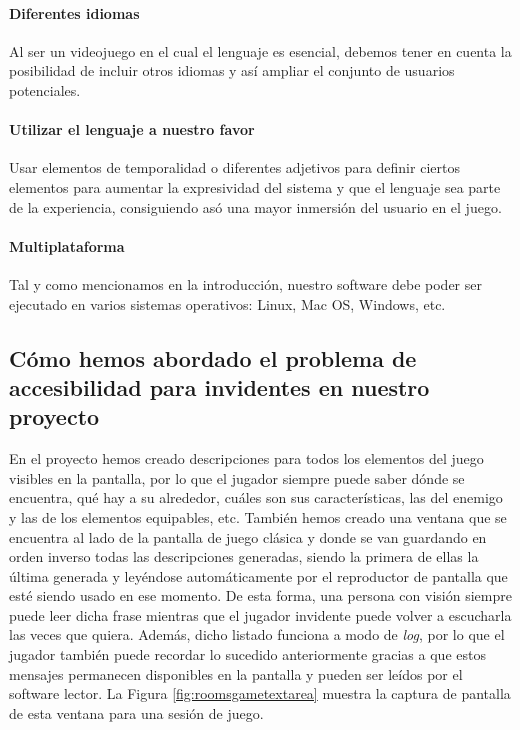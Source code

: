 	\paragraph{Diferentes idiomas} Al ser un videojuego en el cual el lenguaje es esencial, debemos tener en cuenta la posibilidad de incluir otros idiomas y así ampliar el conjunto de usuarios potenciales.
  \paragraph{Utilizar el lenguaje a nuestro favor} Usar elementos de temporalidad o diferentes adjetivos para definir ciertos elementos para aumentar la expresividad del sistema y que el lenguaje sea parte de la experiencia, consiguiendo asó una mayor inmersión del usuario en el juego.
	\paragraph{Multiplataforma} Tal y como mencionamos en la introducción, nuestro software debe poder ser ejecutado en varios sistemas operativos: Linux, Mac OS, Windows, etc.
	
\subsection{Cómo hemos abordado el problema de accesibilidad para invidentes en nuestro proyecto}

En el proyecto hemos creado descripciones para todos los elementos del juego visibles en la pantalla, por lo que el jugador siempre puede saber dónde se encuentra, qué hay a su alrededor, cuáles son sus características, las del enemigo y las de los elementos equipables, etc. También hemos creado una ventana que se encuentra al lado de la pantalla de juego clásica y donde se van guardando en orden inverso todas las descripciones generadas, siendo la primera de ellas la última generada y leyéndose automáticamente por el reproductor de pantalla que esté siendo usado en ese momento. De esta forma, una persona con visión siempre puede leer dicha frase mientras que el jugador invidente puede volver a escucharla las veces que quiera. Además, dicho listado funciona a modo de \textit{log}, por lo que el jugador también puede recordar lo sucedido anteriormente gracias a que estos mensajes permanecen disponibles en la pantalla y pueden ser leídos por el software lector. La Figura \ref{fig:roomsgametextarea} muestra la captura de pantalla de esta ventana para una sesión de juego.

